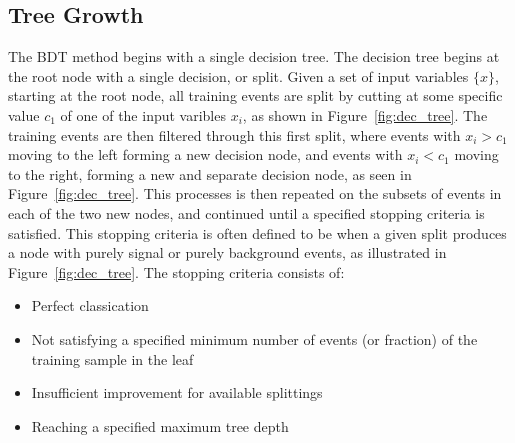 \subsection{Tree Growth}
The BDT method begins with a single decision tree. The decision tree begins at the root node with a single decision, or split.
Given a set of input variables $\{x\}$, starting at the root node, all training events are split by cutting at some specific value $c_{1}$
of one of the input varibles $x_{i}$, as shown in Figure~\ref{fig:dec_tree}.
The training events are then filtered through this first split, where events
with $x_{i} > c_{1}$ moving to the left forming a new decision node, and events with $x_{i} < c_{1}$ moving to the right, forming a new and separate 
decision node, as seen in Figure~\ref{fig:dec_tree}. This processes is then repeated on the subsets of events in each of the two new nodes, and continued until
a specified stopping criteria is satisfied. This stopping criteria is often defined to be when a given split produces a node with purely signal or purely
background events, as illustrated in Figure~\ref{fig:dec_tree}. The stopping criteria consists of:
\begin{itemize}
\item Perfect classication
\item Not satisfying a specified minimum number of events (or fraction) of the training sample in the leaf
\item Insufficient improvement for available splittings
\item Reaching a specified maximum tree depth
\end{itemize}

